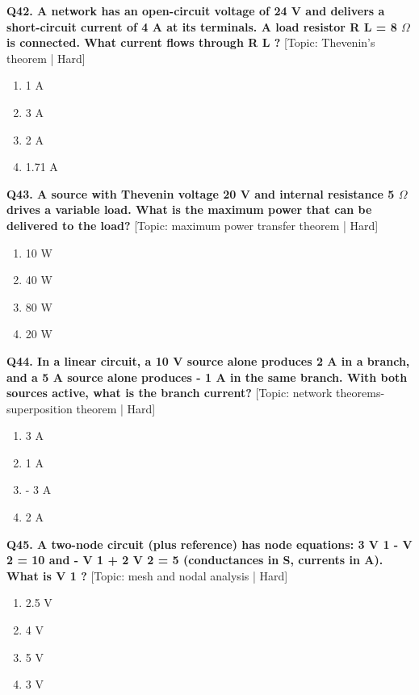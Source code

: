\noindent\textbf{Q42. A network has an open-circuit voltage of 24 V and delivers a short-circuit current of 4 A at its terminals. A load resistor R L = 8 $\Omega$ is connected. What current flows through R L ?} \hfill [Topic: Thevenin's theorem | Hard]
\begin{enumerate}[label=(\alph*),topsep=2pt,itemsep=1pt,partopsep=0pt,parsep=0pt]
    \item {1 A}
    \item {3 A}
    \item {2 A}
    \item {1.71 A}
\end{enumerate}
\vspace{2mm}

\noindent\textbf{Q43. A source with Thevenin voltage 20 V and internal resistance 5 $\Omega$ drives a variable load. What is the maximum power that can be delivered to the load?} \hfill [Topic: maximum power transfer theorem | Hard]
\begin{enumerate}[label=(\alph*),topsep=2pt,itemsep=1pt,partopsep=0pt,parsep=0pt]
    \item {10 W}
    \item {40 W}
    \item {80 W}
    \item {20 W}
\end{enumerate}
\vspace{2mm}

\noindent\textbf{Q44. In a linear circuit, a 10 V source alone produces 2 A in a branch, and a 5 A source alone produces - 1 A in the same branch. With both sources active, what is the branch current?} \hfill [Topic: network theorems- superposition theorem | Hard]
\begin{enumerate}[label=(\alph*),topsep=2pt,itemsep=1pt,partopsep=0pt,parsep=0pt]
    \item {3 A}
    \item {1 A}
    \item {- 3 A}
    \item {2 A}
\end{enumerate}
\vspace{2mm}

\noindent\textbf{Q45. A two-node circuit (plus reference) has node equations: 3 V 1 - V 2 = 10 and - V 1 + 2 V 2 = 5 (conductances in S, currents in A). What is V 1 ?} \hfill [Topic: mesh and nodal analysis | Hard]
\begin{enumerate}[label=(\alph*),topsep=2pt,itemsep=1pt,partopsep=0pt,parsep=0pt]
    \item {2.5 V}
    \item {4 V}
    \item {5 V}
    \item {3 V}
\end{enumerate}
\vspace{2mm}

